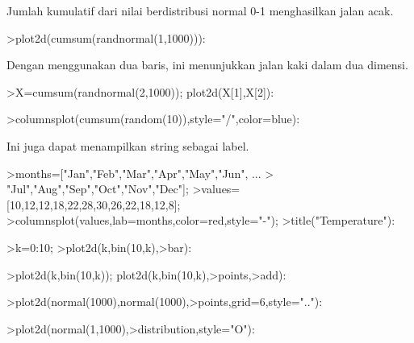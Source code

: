 \documentclass[12pt,arial,letterpaper]{book}
\begin{document}
\begin{eulercomment}
\begin{eulercomment}
\begin{eulercomment}
\begin{eulercomment}
\begin{eulercomment}
\begin{eulercomment}
\begin{eulercomment}
\begin{eulercomment}
\begin{eulercomment}
\begin{eulercomment}
\begin{eulercomment}
\begin{eulercomment}
\begin{eulercomment}
\begin{eulercomment}
\begin{eulercomment}
\begin{eulercomment}
\begin{eulercomment}
Jumlah kumulatif dari nilai berdistribusi normal 0-1 menghasilkan
jalan acak.
\end{eulercomment}
\begin{eulerprompt}
>plot2d(cumsum(randnormal(1,1000))):
\end{eulerprompt}
\begin{eulercomment}
Dengan menggunakan dua baris, ini menunjukkan jalan kaki dalam dua
dimensi.
\end{eulercomment}
\begin{eulerprompt}
>X=cumsum(randnormal(2,1000)); plot2d(X[1],X[2]):
\end{eulerprompt}
\begin{eulerprompt}
>columnsplot(cumsum(random(10)),style="/",color=blue):
\end{eulerprompt}
\begin{eulercomment}
Ini juga dapat menampilkan string sebagai label.
\end{eulercomment}
\begin{eulerprompt}
>months=["Jan","Feb","Mar","Apr","May","Jun", ...
>  "Jul","Aug","Sep","Oct","Nov","Dec"];
>values=[10,12,12,18,22,28,30,26,22,18,12,8];
>columnsplot(values,lab=months,color=red,style="-");
>title("Temperature"):
\end{eulerprompt}
\begin{eulerprompt}
>k=0:10;
>plot2d(k,bin(10,k),>bar):
\end{eulerprompt}
\begin{eulerprompt}
>plot2d(k,bin(10,k)); plot2d(k,bin(10,k),>points,>add):
\end{eulerprompt}
\begin{eulerprompt}
>plot2d(normal(1000),normal(1000),>points,grid=6,style=".."):
\end{eulerprompt}
\begin{eulerprompt}
>plot2d(normal(1,1000),>distribution,style="O"):
\end{eulerprompt}

\end{eulercomment}
\end{eulercomment}
\end{eulercomment}
\end{eulercomment}
\end{eulercomment}
\end{eulercomment}
\end{eulercomment}
\end{eulercomment}
\end{eulercomment}
\end{eulercomment}
\end{eulercomment}
\end{eulercomment}
\end{eulercomment}
\end{eulercomment}
\end{eulercomment}
\end{eulercomment}
\end{document}
